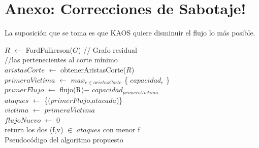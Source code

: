 \documentclass{article}
\begin{document}
\part{Anexo: Correcciones de Sabotaje!}
La suposición que se toma es que KAOS quiere disminuir el flujo lo más posible.
\begin{algorithm}
    \BlankLine

    $R$ $\leftarrow$ FordFulkerson($G$) // Grafo residual \\
    //las pertenecientes al corte mínimo \\
    $aristasCorte$ $\leftarrow$ obtenerAristasCorte($R$) \\
    $primeraVictima$ $\leftarrow$ $max_{e \in aristasCorte}$ \{ $capacidad_e$ \} \\
    $primerFlujo$ $\leftarrow$ flujo(R)$-$ $capacidad_{primeraVictima}$ \\
    $ataques$ $\leftarrow$ \{($primerFlujo$,$atacada$)\}\\
    $victima$ $\leftarrow$ $primeraVictima$ \\
    \BlankLine
    $flujoNuevo$ $\leftarrow$ 0\\
    \BlankLine
    return los dos (f,v) $\in$ $ataques$ con menor f \\

    \caption{Pseudocódigo del algoritmo propuesto}
\end{algorithm}
\end{document}
